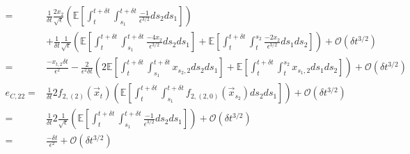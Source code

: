 \documentclass[12pt]{article}
\begin{document}
\begin{equation}
\begin{aligned}
=& 
\frac{1}{\delta t} \frac{2 x_2}{\sqrt{\epsilon}} \left( \mathbb{E} \left[ \int_t^{t+\delta t} \int_{s_1}^{t+\delta t} \frac{-1}{\epsilon^{3/2}} ds_2 ds_1 \right]  \right) \\
&+ \frac{1}{\delta t} \frac{1}{\sqrt{\epsilon}} \left( \mathbb{E} \left[ \int_t^{t+\delta t} \int_{s_1}^{t + \delta t} \frac{-4 x_2}{\epsilon^{3/2}} ds_2 ds_1 \right]
+ \mathbb{E} \left[ \int_t^{t+\delta t} \int_t^{s_2} \frac{-2 x_2}{\epsilon^{3/2}} ds_1 ds_2 \right] \right) 
+ \mathcal{O} (\delta t^{3/2}) \\
=& 
 \frac{- x_{t,2} \delta t}{\epsilon^2}
- \frac{2}{\epsilon^2 \delta t} \left( 2 \mathbb{E} \left[ \int_t^{t+\delta t} \int_{s_1}^{t + \delta t} x_{s_2,2} ds_2 ds_1 \right]
+ \mathbb{E} \left[ \int_t^{t+\delta t} \int_t^{s_2} x_{s_1,2} ds_1 ds_2 \right] \right) 
+ \mathcal{O} (\delta t^{3/2}) \\
e_{C, 22} 
=&
 \frac{1}{\delta t} 2 f_{2,(2)}(\vec{x}_t) \left( \mathbb{E} \left[ \int_t^{t+\delta t} \int_{s_1}^{t+\delta t} f_{2,(2,0)}(\vec{x}_{s_2}) ds_2 ds_1 \right]  \right) 
+ \mathcal{O} (\delta t^{3/2}) \\
=&
 \frac{1}{\delta t} 2 \frac{1}{\sqrt{\epsilon}} \left( \mathbb{E} \left[ \int_t^{t+\delta t} \int_{s_1}^{t+\delta t} \frac{-1}{\epsilon^{3/2}} ds_2 ds_1 \right]  \right) 
+ \mathcal{O} (\delta t^{3/2})\\
=&
\frac{-\delta t}{\epsilon^2} 
+ \mathcal{O} (\delta t^{3/2})
\end{aligned}
\end{equation}
\end{document}
